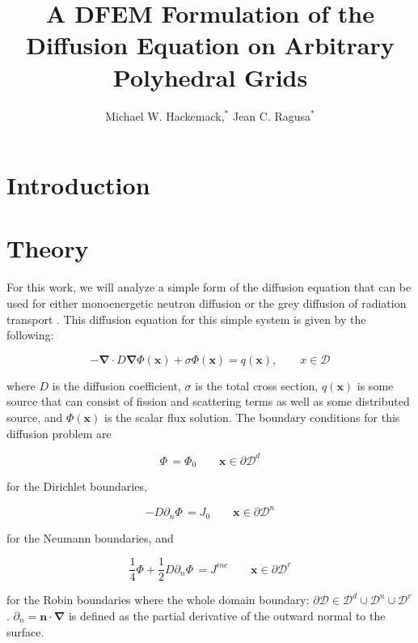 \documentclass{anstrans}
\title{A DFEM Formulation of the Diffusion Equation on Arbitrary Polyhedral Grids}
\author{Michael W. Hackemack,$^{*}$ Jean C. Ragusa$^{*}$}
\institute{
$^{*}$Department of Nuclear Engineering, Texas A\&M Univeristy, 
}
\renewcommand{\vec}[1]{\bm{#1}} %
\begin{document}
\section{Introduction}


\section{Theory}

For this work, we will analyze a simple form of the diffusion equation that can be used for either monoenergetic neutron diffusion or the grey diffusion of radiation transport \cite{duderstadt1976nuclear}. This diffusion equation for this simple system is given by the following:

\begin{equation} \label{eq:DIffEq}
- \vec{\nabla} \cdot D \vec{\nabla} \Phi(\vec{x}) + \sigma \Phi(\vec{x}) = q(\vec{x}), \qquad x \in \mathcal{D}
\end{equation}

\noindent where $D$ is the diffusion coefficient, $\sigma$ is the total cross section, $q(\vec{x})$ is some source that can consist of fission and scattering terms as well as some distributed source, and $\Phi(\vec{x})$ is the scalar flux solution. The boundary conditions for this diffusion problem are

\begin{equation} \label{eq:dirichlet_bndy}
\Phi \, =\Phi_0 \qquad \vec{x} \in \partial \mathcal{D}^d
\end{equation}

\noindent for the Dirichlet boundaries,

\begin{equation} \label{eq:neumann_bndy}
- D \partial_n \Phi \, = J_{0} \qquad \vec{x} \in \partial \mathcal{D}^n
\end{equation}

\noindent for the Neumann boundaries, and

\begin{equation} \label{eq:robin_bndy}
 \frac{1}{4} \Phi + \frac{1}{2} D \partial_n \Phi \, = J^{inc} \qquad \vec{x} \in \partial \mathcal{D}^r
\end{equation}

\noindent for the Robin boundaries where the whole domain boundary: $\partial \mathcal{D} \in \mathcal{D}^d \cup \mathcal{D}^n \cup \mathcal{D}^r$. $\partial_n = \vec{n} \cdot \vec{\nabla}$ is defined as the partial derivative of the outward normal to the surface.
\end{document}
